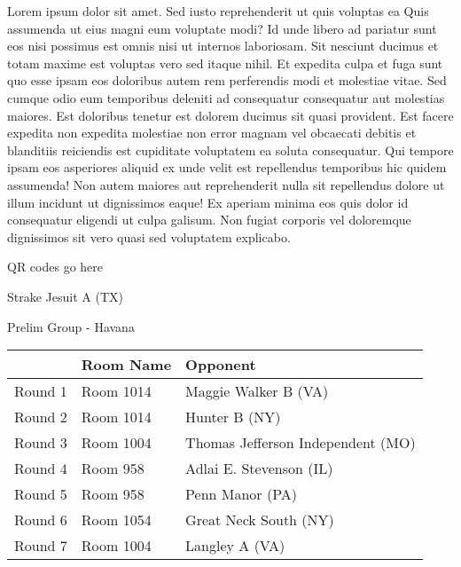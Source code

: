 \documentclass{article}%
\begin{document}
\vspace*{8pt}%
\linebreak%
\newline%
\newline%
Lorem ipsum dolor sit amet. Sed iusto reprehenderit ut quis voluptas ea Quis assumenda ut eius magni eum voluptate modi? Id unde libero ad pariatur sunt eos nisi possimus est omnis nisi ut internos laboriosam. Sit nesciunt ducimus et totam maxime est voluptas vero sed itaque nihil. Et expedita culpa et fuga sunt quo esse ipsam eos doloribus autem rem perferendis modi et molestiae vitae.\newline%
\newline%
Sed cumque odio eum temporibus deleniti ad consequatur consequatur aut molestias maiores. Est doloribus tenetur est dolorem ducimus sit quasi provident. Est facere expedita non expedita molestiae non error magnam vel obcaecati debitis et blanditiis reiciendis est cupiditate voluptatem ea soluta consequatur. Qui tempore ipsam eos asperiores aliquid ex unde velit est repellendus temporibus hic quidem assumenda!\newline%
\newline%
Non autem maiores aut reprehenderit nulla sit repellendus dolore ut illum incidunt ut dignissimos eaque! Ex aperiam minima eos quis dolor id consequatur eligendi ut culpa galisum. Non fugiat corporis vel doloremque dignissimos sit vero quasi sed voluptatem explicabo.\newline%
\newline%
%
\vspace*{30pt}%
\begin{center}%
\begin{Huge}%
QR codes go here%
\end{Huge}%
\end{center}%
\newpage%
%
\begin{center}%
\begin{Huge}%
Strake Jesuit A (TX)%
\end{Huge}%
\vspace*{8pt}%
\linebreak%
\begin{Large}%
Prelim Group {-} Havana%
\end{Large}%
\end{center}%
\begin{tabularx}{\textwidth}{|c|Y|Y|}%
\hline%
&Room Name&Opponent\\%
\hline%
Round 1&Room 1014&Maggie Walker B (VA)\\%
Round 2&Room 1014&Hunter B (NY)\\%
Round 3&Room 1004&Thomas Jefferson Independent (MO)\\%
Round 4&Room 958&Adlai E. Stevenson (IL)\\%
Round 5&Room 958&Penn Manor (PA)\\%
Round 6&Room 1054&Great Neck South (NY)\\%
Round 7&Room 1004&Langley A (VA)\\%
\hline%
\end{tabularx}%
\end{document}
